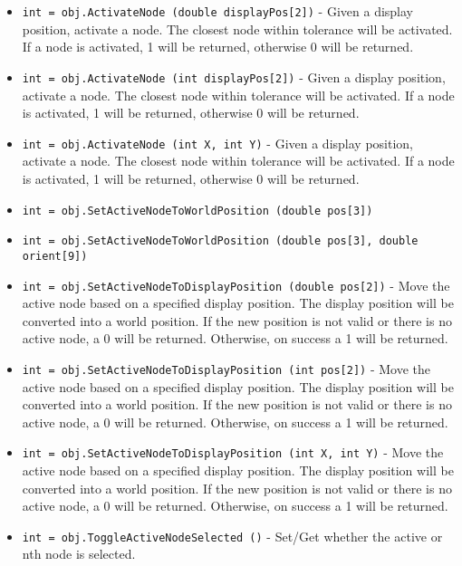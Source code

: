 \begin{itemize}
\item  \verb|int = obj.ActivateNode (double displayPos[2])| -  Given a display position, activate a node. The closest
 node within tolerance will be activated. If a node is
 activated, 1 will be returned, otherwise 0 will be
 returned.

\item  \verb|int = obj.ActivateNode (int displayPos[2])| -  Given a display position, activate a node. The closest
 node within tolerance will be activated. If a node is
 activated, 1 will be returned, otherwise 0 will be
 returned.

\item  \verb|int = obj.ActivateNode (int X, int Y)| -  Given a display position, activate a node. The closest
 node within tolerance will be activated. If a node is
 activated, 1 will be returned, otherwise 0 will be
 returned.

\item  \verb|int = obj.SetActiveNodeToWorldPosition (double pos[3])|

\item  \verb|int = obj.SetActiveNodeToWorldPosition (double pos[3], double orient[9])|

\item  \verb|int = obj.SetActiveNodeToDisplayPosition (double pos[2])| -  Move the active node based on a specified display position.
 The display position will be converted into a world
 position. If the new position is not valid or there is
 no active node, a 0 will be returned. Otherwise, on
 success a 1 will be returned.

\item  \verb|int = obj.SetActiveNodeToDisplayPosition (int pos[2])| -  Move the active node based on a specified display position.
 The display position will be converted into a world
 position. If the new position is not valid or there is
 no active node, a 0 will be returned. Otherwise, on
 success a 1 will be returned.

\item  \verb|int = obj.SetActiveNodeToDisplayPosition (int X, int Y)| -  Move the active node based on a specified display position.
 The display position will be converted into a world
 position. If the new position is not valid or there is
 no active node, a 0 will be returned. Otherwise, on
 success a 1 will be returned.

\item  \verb|int = obj.ToggleActiveNodeSelected ()| -  Set/Get whether the active or nth node is selected. 


\end{itemize}
